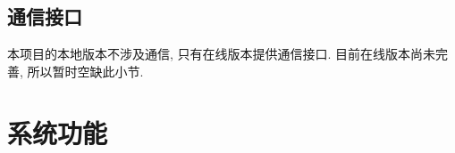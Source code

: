 \documentclass{ctexart}
\begin{document}
\subsection{通信接口}
本项目的本地版本不涉及通信, 只有在线版本提供通信接口. 目前在线版本尚未完善, 所以暂时空缺此小节.



\section{系统功能}\label{S:system-features}


\end{document}
